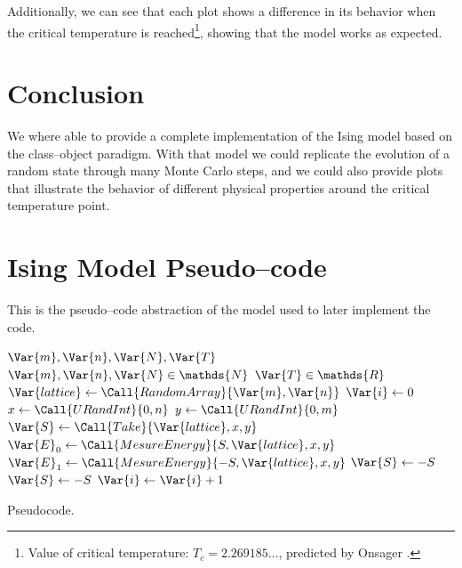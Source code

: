 \documentclass[
    10pt,
    journal,
    compsoc,
    english
]{IEEEtran}
\begin{document}
Additionally, we can see that each plot shows a difference in its behavior when the critical temperature is reached\footnote{Value of critical temperature: $T_c = 2.269185\ldots$, predicted by Onsager \cite{Blundell}.}, showing that the model works as expected.

\section{Conclusion}
We where able to provide a complete implementation of the Ising model based on the class--object paradigm. With that model we could replicate the evolution of a random state through many Monte Carlo steps, and we could also provide plots that illustrate the behavior of different physical properties around the critical temperature point.




\appendices

\section{Ising Model Pseudo--code}
This is the pseudo--code abstraction of the model used to later implement the code.
\begin{algorithm}[hbt]
    \centering
    \begin{myalg}[1]
    \Require $\Var{m}, \Var{n}, \Var{N}, \Var{T}$
    \Ensure $\Var{m}, \Var{n}, \Var{N} \in \mathds{N}$
    \Ensure $\Var{T} \in \mathds{R}$
    \State $\Var{lattice} \gets \Call{RandomArray}{\Var{m}, \Var{n}}$
    \State $\Var{i} \gets 0$
    \State \null
        \State $x \gets \Call{URandInt}{0, n}$
        \State $y \gets \Call{URandInt}{0, m}$
        \State $\Var{S} \gets \Call{Take}{\Var{lattice}, x, y}$
        \State $\Var{E}_0 \gets \Call{MesureEnergy}{S, \Var{lattice}, x, y}$
        \State $\Var{E}_1 \gets \Call{MesureEnergy}{-S, \Var{lattice}, x, y}$
        \State \null
            \State $\Var{S} \gets -S$
            \State $\Var{S} \gets -S$
        \EndIf
        \State $\Var{i} \gets \Var{i} + 1$
    \EndWhile
    \end{myalg}
    \caption{Pseudocode.}
    \label{alg:main}
\end{algorithm}
\end{document}
